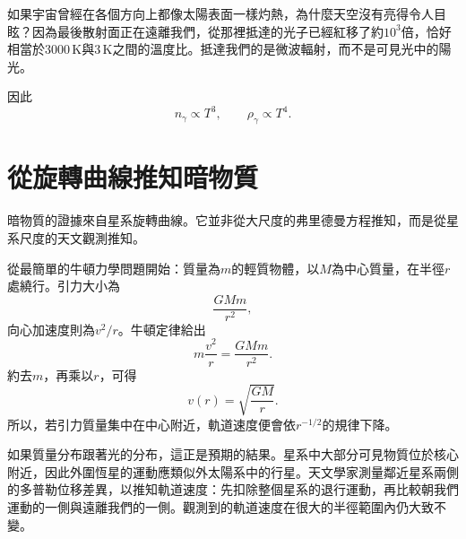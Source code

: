 如果宇宙曾經在各個方向上都像太陽表面一樣灼熱，為什麼天空沒有亮得令人目眩？因為最後散射面正在遠離我們，從那裡抵達的光子已經紅移了約\(10^3\)倍，恰好相當於\(3000\,\mathrm K\)與\(3\,\mathrm K\)之間的溫度比。抵達我們的是微波輻射，而不是可見光中的陽光。

\begin{classroomqa}
\end{classroomqa}

\begin{classroomqa}
\end{classroomqa}

因此
\begin{equation}
n_\gamma\propto T^3,
\qquad
\rho_\gamma\propto T^4.
\end{equation}

\section{從旋轉曲線推知暗物質}

暗物質的證據來自星系旋轉曲線。它並非從大尺度的弗里德曼方程推知，而是從星系尺度的天文觀測推知。

從最簡單的牛頓力學問題開始：質量為\(m\)的輕質物體，以\(M\)為中心質量，在半徑\(r\)處繞行。引力大小為
\begin{equation}
\frac{GMm}{r^2},
\end{equation}
向心加速度則為\(v^2/r\)。牛頓定律給出
\begin{equation}
m\frac{v^2}{r}=\frac{GMm}{r^2}.
\end{equation}
約去\(m\)，再乘以\(r\)，可得
\begin{equation}
v(r)=\sqrt{\frac{GM}{r}}.
\end{equation}
所以，若引力質量集中在中心附近，軌道速度便會依\(r^{-1/2}\)的規律下降。

如果質量分布跟著光的分布，這正是預期的結果。星系中大部分可見物質位於核心附近，因此外圍恆星的運動應類似外太陽系中的行星。天文學家測量鄰近星系兩側的多普勒位移差異，以推知軌道速度：先扣除整個星系的退行運動，再比較朝我們運動的一側與遠離我們的一側。觀測到的軌道速度在很大的半徑範圍內仍大致不變。

